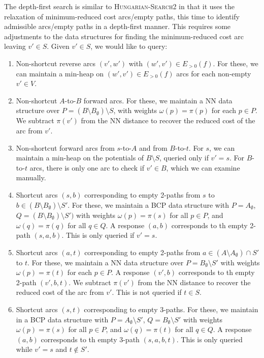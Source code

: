 \documentclass[11pt]{article}
\theoremstyle{plain}
\numberwithin{figure}{section}
\begin{document}
The depth-first search is similar to \textsc{Hungarian-Search2} in that it
uses the relaxation of minimum-reduced cost arcs/empty paths, this time to
identify admissible arcs/empty paths in a depth-first manner.
This requires some adjustments to the data structures for finding the
minimum-reduced cost arc leaving $v' \in S$.
Given $v' \in S$, we would like to query:
\begin{enumerate}
\item Non-shortcut reverse arcs $(v', w')$ with $(w', v') \in E_{>0}(f)$.
	For these, we can maintain a min-heap on $(w', v') \in E_{>0}(f)$ arcs
	for each non-empty $v' \in V$.
\item Non-shortcut $A$-to-$B$ forward arcs.
	For these, we maintain a NN data structure over
	$P = (B \setminus B_\emptyset) \setminus S$, with weights
	$\omega(p) = \pi(p)$ for each $p \in P$.
	We subtract $\pi(v')$ from the NN distance to recover the reduced cost
	of the arc from $v'$.
\item Non-shortcut forward arcs from $s$-to-$A$ and from $B$-to-$t$.
	For $s$, we can maintain a min-heap on the potentials of
	$B \setminus S$, queried only if $v' = s$.
	For $B$-to-$t$ arcs, there is only one arc to check if $v' \in B$,
	which we can examine manually.

\item Shortcut arcs $(s, b)$ corresponding to empty 2-paths from $s$ to
	$b \in (B \setminus B_\emptyset) \setminus S'$.
	For these, we maintain a BCP data structure with $P = A_\emptyset$,
	$Q = (B \setminus B_\emptyset) \setminus S')$ with weights
	$\omega(p) = \pi(s)$ for all $p \in P$, and $\omega(q) = \pi(q)$ for
	all $q \in Q$.
	A response $(a, b)$ corresponds to th empty 2-path $(s, a, b)$.
	This is only queried if $v' = s$.
\item Shortcut arcs $(a, t)$ corresponding to empty 2-paths from
	$a \in (A \setminus A_\emptyset) \cap S'$ to $t$.
	For these, we maintain a NN data structure over
	$P = B_\emptyset \setminus S'$ with weights $\omega(p) = \pi(t)$ for
	each $p \in P$.
	A response $(v', b)$ corresponds to th empty 2-path $(v', b, t)$.
	We subtract $\pi(v')$ from the NN distance to recover the reduced cost
	of the arc from $v'$.
	This is not queried if $t \in S$.
\item Shortcut arcs $(s, t)$ corresponding to empty 3-paths.
	For these, we maintain in a BCP data structure with
	$P = A_\emptyset \setminus S'$, $Q = B_\emptyset \setminus S'$ with
	weights $\omega(p) = \pi(s)$ for all
	$p \in P$, and $\omega(q) = \pi(t)$ for all $q \in Q$.
	A response $(a, b)$ corresponds to th empty 3-path $(s, a, b, t)$.
	This is only queried while $v' = s$ and $t \not\in S'$.
\end{enumerate}
\end{document}
